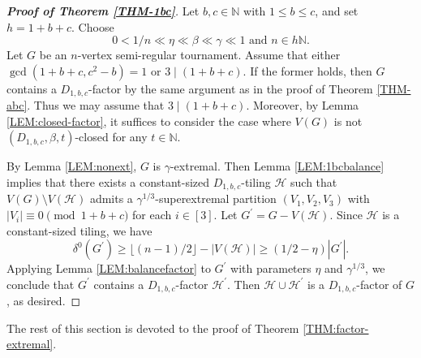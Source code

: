 \documentclass[11pt,a4paper,reqno]{amsart}
\theoremstyle{definition} %
\begin{document}
\begin{proof}[\textbf{Proof of Theorem \ref{THM-1bc}}]
Let $b,c\in \mathbb{N}$ with $1\leqslant b\leqslant c$, and set $h=1+b+c$. Choose
$$
0<1/n\ll \eta\ll \beta\ll\gamma\ll 1
\text{ and } 
n\in h\mathbb{N}.
$$
Let $G$ be an $n$-vertex semi-regular tournament. Assume that either $\gcd(1+b+c,c^2-b)=1$ or $3\mid (1+b+c)$. If the former holds, then $G$ contains a $D_{1,b,c}$-factor by the same argument as in the proof of Theorem \ref{THM-abc}. Thus we may assume that $3\mid (1+b+c)$. Moreover, by Lemma \ref{LEM:closed-factor}, it suffices to consider the case where $V(G)$ is not $(D_{1,b,c},\beta,t)$-closed for any $t\in \mathbb{N}$.

By Lemma \ref{LEM:nonext}, $G$ is $\gamma$-extremal. Then Lemma \ref{LEM:1bcbalance} implies that there exists a constant-sized $D_{1,b,c}$-tiling $\mathcal{H}$ such that $V(G)\setminus V(\mathcal{H})$ admits a $\gamma^{1/3}$-superextremal partition $(V_1,V_2,V_3)$ with $|V_i|\equiv 0\pmod{1+b+c}$ for each $i\in[3]$. Let $G^\prime=G-V(\mathcal{H})$. Since $\mathcal{H}$ is a constant-sized tiling, we have
$$
\delta^0(G^\prime)\geqslant \lfloor (n-1)/2\rfloor-|V(\mathcal{H})|
\geqslant (1/2-\eta)|G^\prime|.
$$
Applying Lemma \ref{LEM:balancefactor} to $G^\prime$ with parameters $\eta$ and $\gamma^{1/3}$, we conclude that $G^\prime$ contains a $D_{1,b,c}$-factor $\mathcal{H}^\prime$. Then $\mathcal{H}\cup\mathcal{H}^\prime$ is a $D_{1,b,c}$-factor of $G$, as desired.
\end{proof}


The rest of this section is devoted to the proof of Theorem \ref{THM:factor-extremal}.
\end{document}
